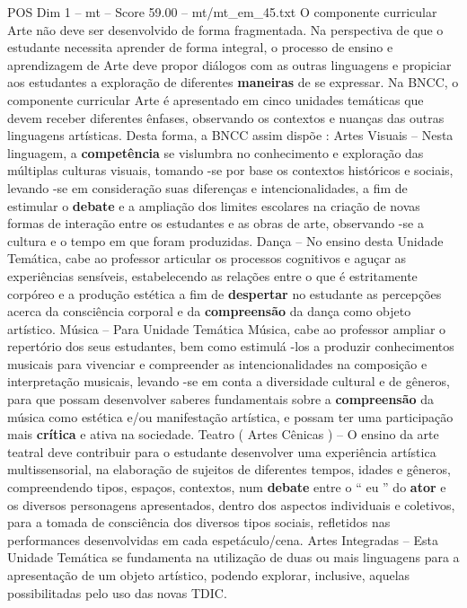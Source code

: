 \begin{textsample}{POS Dim 1 – mt – Score 59.00 – mt/mt\_em\_45.txt}
O componente curricular Arte não deve ser desenvolvido de forma fragmentada.
Na perspectiva de que o estudante necessita aprender de forma integral, o processo de ensino e aprendizagem de Arte deve propor diálogos com as outras linguagens e propiciar aos estudantes a exploração de diferentes \textbf{maneiras} de se expressar.
Na BNCC, o componente curricular Arte é apresentado em cinco unidades temáticas que devem receber diferentes ênfases, observando os contextos e nuanças das outras linguagens artísticas.
Desta forma, a BNCC assim dispõe : Artes Visuais – Nesta linguagem, a \textbf{competência} se vislumbra no conhecimento e exploração das múltiplas culturas visuais, tomando -se por base os contextos históricos e sociais, levando -se em consideração suas diferenças e intencionalidades, a fim de estimular o \textbf{debate} e a ampliação dos limites escolares na criação de novas formas de interação entre os estudantes e as obras de arte, observando -se a cultura e o tempo em que foram produzidas.
Dança – No ensino desta Unidade Temática, cabe ao professor articular os processos cognitivos e aguçar as experiências sensíveis, estabelecendo as relações entre o que é estritamente corpóreo e a produção estética a fim de \textbf{despertar} no estudante as percepções acerca da consciência corporal e da \textbf{compreensão} da dança como objeto artístico.
Música – Para Unidade Temática Música, cabe ao professor ampliar o repertório dos seus estudantes, bem como estimulá -los a produzir conhecimentos musicais para vivenciar e compreender as intencionalidades na composição e interpretação musicais, levando -se em conta a diversidade cultural e de gêneros, para que possam desenvolver saberes fundamentais sobre a \textbf{compreensão} da música como estética e/ou manifestação artística, e possam ter uma participação mais \textbf{crítica} e ativa na sociedade.
Teatro ( Artes Cênicas ) – O ensino da arte teatral deve contribuir para o estudante desenvolver uma experiência artística multissensorial, na elaboração de sujeitos de diferentes tempos, idades e gêneros, compreendendo tipos, espaços, contextos, num \textbf{debate} entre o “ eu ” do \textbf{ator} e os diversos personagens apresentados, dentro dos aspectos individuais e coletivos, para a tomada de consciência dos diversos tipos sociais, refletidos nas performances desenvolvidas em cada espetáculo/cena.
Artes Integradas – Esta Unidade Temática se fundamenta na utilização de duas ou mais linguagens para a apresentação de um objeto artístico, podendo explorar, inclusive, aquelas possibilitadas pelo uso das novas TDIC.

\end{textsample}
